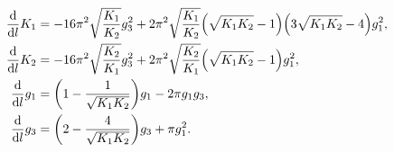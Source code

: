 \documentclass[english, parskip=full]{scrartcl}
\begin{document}
\begin{align}
\frac{\d}{\d l} K_1 &= -16\pi^2 \sqrt{\frac{K_1}{K_2}} g_3^2 + 2\pi^2 \sqrt{\frac{K_1}{K_2}} \kla*{\sqrt{K_1K_2} - 1} \kla*{3\sqrt{K_1K_2} - 4} g_1^2,\\
\frac{\d}{\d l} K_2 &= -16\pi^2 \sqrt{\frac{K_2}{K_1}} g_3^2 + 2\pi^2 \sqrt{\frac{K_2}{K_1}} \kla*{\sqrt{K_1K_2} - 1} g_1^2,\\
\frac{\d}{\d l} g_1 &= \kla*{1 - \frac{1}{\sqrt{K_1K_2}}} g_1 - 2\pi g_1 g_3,\\
\frac{\d}{\d l} g_3 &= \kla*{2 - \frac{4}{\sqrt{K_1K_2}}} g_3 + \pi g_1^2.
\end{align}
\end{document}

